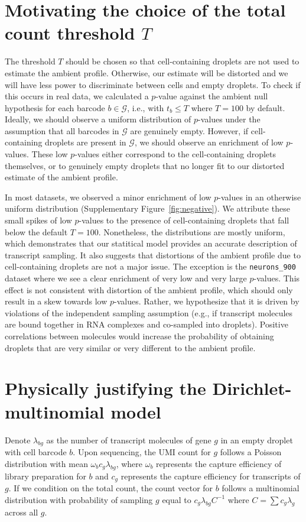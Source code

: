 \documentclass{article}
\newcommand{\code}[1]{\texttt{#1}}
\begin{document}
\section{Motivating the choice of the total count threshold $T$}
The threshold $T$ should be chosen so that cell-containing droplets are not used to estimate the ambient profile.
Otherwise, our estimate will be distorted and we will have less power to discriminate between cells and empty droplets.
To check if this occurs in real data, we calculated a $p$-value against the ambient null hypothesis for each barcode $b \in \mathcal{G}$, 
i.e., with $t_b \le T$ where $T = 100$ by default.
Ideally, we should observe a uniform distribution of $p$-values under the assumption that all barcodes in $\mathcal{G}$ are genuinely empty.
However, if cell-containing droplets are present in $\mathcal{G}$, we should observe an enrichment of low $p$-values.
These low $p$-values either correspond to the cell-containing droplets themselves,
or to genuinely empty droplets that no longer fit to our distorted estimate of the ambient profile.

In most datasets, we observed a minor enrichment of low $p$-values in an otherwise uniform distribution (Supplementary Figure~\ref{fig:negative}). 
We attribute these small spikes of low $p$-values to the presence of cell-containing droplets that fall below the default $T=100$.
Nonetheless, the distributions are mostly uniform, which demonstrates that our statitical model provides an accurate description of transcript sampling.
It also suggests that distortions of the ambient profile due to cell-containing droplets are not a major issue.
The exception is the \code{neurons\_900} dataset where we see a clear enrichment of very low and very large $p$-values.
This effect is not consistent with distortion of the ambient profile, which should only result in a skew towards low $p$-values.
Rather, we hypothesize that it is driven by violations of the independent sampling assumption (e.g., if transcript molecules are bound together in RNA complexes and co-sampled into droplets).
Positive correlations between molecules would increase the probability of obtaining droplets that are very similar or very different to the ambient profile.

\section{Physically justifying the Dirichlet-multinomial model}
Denote $\lambda_{bg}$ as the number of transcript molecules of gene $g$ in an empty droplet with cell barcode $b$.
Upon sequencing, the UMI count for $g$ follows a Poisson distribution \cite{marioni2008rnaseq} with mean $\omega_bc_g\lambda_{bg}$,
where $\omega_b$ represents the capture efficiency of library preparation for $b$ and $c_g$ represents the capture efficiency for transcripts of $g$.
If we condition on the total count, the count vector for $b$ follows a multinomial distribution with probability of sampling $g$ equal to $c_g\lambda_{bg}C^{-1}$
where $C = \sum c_g\lambda_g$ across all $g$.
\end{document}
